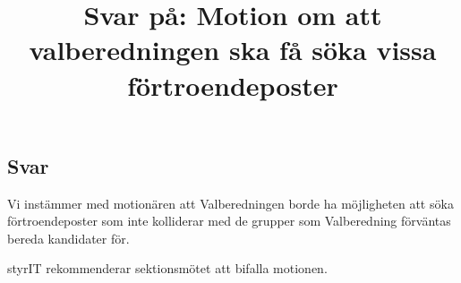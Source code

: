 \documentclass[11pt, noincludeaddress, nopagination]{classes/cthit}
\begin{document}
\title{Svar på: Motion om att valberedningen ska få söka vissa förtroendeposter}

\makeheadfoot%

\makesimpletitle

\subsection*{Svar}
Vi instämmer med motionären att Valberedningen borde ha möjligheten att söka förtroendeposter som inte kolliderar med de grupper som Valberedning förväntas bereda kandidater för. 

styrIT rekommenderar sektionsmötet att bifalla motionen.
\end{document}
